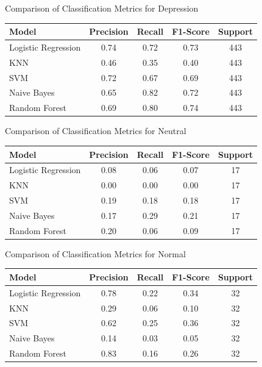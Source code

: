 \begin{center}
\vspace{0.25in}

\centering
\caption{Comparison of Classification Metrics for Depression}
\begin{tabular}{|l|c|c|c|c|}
\hline
\textbf{Model} & \textbf{Precision} & \textbf{Recall} & \textbf{F1-Score} & \textbf{Support} \\ \hline
Logistic Regression & 0.74 & 0.72 & 0.73 & 443 \\ \hline
KNN                & 0.46 & 0.35 & 0.40 & 443 \\ \hline
SVM                & 0.72 & 0.67 & 0.69 & 443 \\ \hline
Naive Bayes        & 0.65 & 0.82 & 0.72 & 443 \\ \hline
Random Forest      & 0.69 & 0.80 & 0.74 & 443 \\ \hline
\end{tabular}

\vspace{0.25in}

\centering
\caption{Comparison of Classification Metrics for Neutral}
\begin{tabular}{|l|c|c|c|c|}
\hline
\textbf{Model} & \textbf{Precision} & \textbf{Recall} & \textbf{F1-Score} & \textbf{Support} \\ \hline
Logistic Regression & 0.08 & 0.06 & 0.07 & 17 \\ \hline
KNN                & 0.00 & 0.00 & 0.00 & 17 \\ \hline
SVM                & 0.19 & 0.18 & 0.18 & 17 \\ \hline
Naive Bayes        & 0.17 & 0.29 & 0.21 & 17 \\ \hline
Random Forest      & 0.20 & 0.06 & 0.09 & 17 \\ \hline
\end{tabular}


\vspace{0.25in}

\caption{Comparison of Classification Metrics for Normal}
\begin{tabular}{|l|c|c|c|c|}
\hline
\textbf{Model} & \textbf{Precision} & \textbf{Recall} & \textbf{F1-Score} & \textbf{Support} \\ \hline
Logistic Regression & 0.78 & 0.22 & 0.34 & 32 \\ \hline
KNN                & 0.29 & 0.06 & 0.10 & 32 \\ \hline
SVM                & 0.62 & 0.25 & 0.36 & 32 \\ \hline
Naive Bayes        & 0.14 & 0.03 & 0.05 & 32 \\ \hline
Random Forest      & 0.83 & 0.16 & 0.26 & 32 \\ \hline
\end{tabular}


\end{center}
